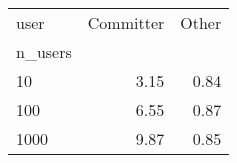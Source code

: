 \begin{tabular}{lrr}
\toprule
user & Committer & Other \\
n_users &  &  \\
\midrule
10 & 3.15 & 0.84 \\
100 & 6.55 & 0.87 \\
1000 & 9.87 & 0.85 \\
\bottomrule
\end{tabular}

